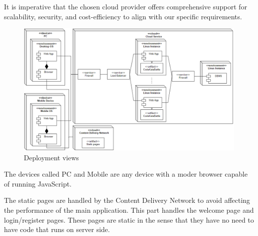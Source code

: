 \documentclass[12pt, a4paper]{report}
\begin{document}
    It is imperative that the chosen cloud provider offers comprehensive support for scalability, security, and cost-efficiency to align with our specific requirements.
    \begin{figure}[H]
        \centering
        \includegraphics[width=1.0\linewidth]{images/deployment_view.png}
        \caption{Deployment views}
    \end{figure}
    The devices called PC and Mobile are any device with a moder browser capable of running JavaScript. 
    
    The static pages are handled by the Content Delivery Network to avoid affecting the performance of the main application. 
    This part handles the welcome page and login/register pages. 
    These pages are static in the sense that they have no need to have code that runs on server side. 
\end{document}
